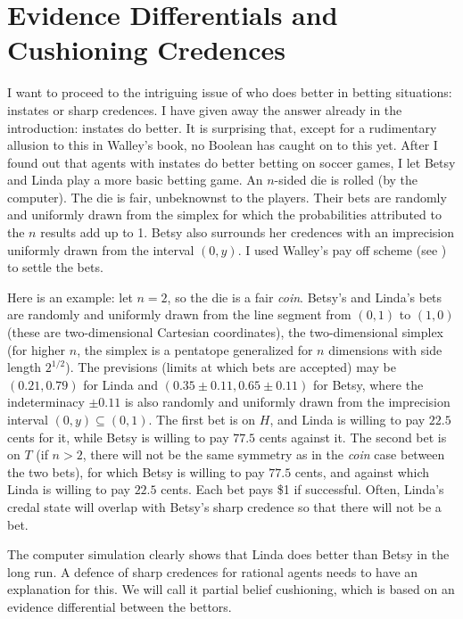 \documentclass[11pt]{article}
\begin{document}
\section{Evidence Differentials and Cushioning Credences}
\label{WalleysWorldCupWoes}

I want to proceed to the intriguing issue of who does better in
betting situations: instates or sharp credences. I have given away the
answer already in the introduction: instates do better. It is
surprising that, except for a rudimentary allusion to this in Walley's
book, no Boolean has caught on to this yet. After I found out that
agents with instates do better betting on soccer games, I let Betsy
and Linda play a more basic betting game. An $n$-sided die is rolled
(by the computer). The die is fair, unbeknownst to the players. Their
bets are randomly and uniformly drawn from the simplex for which the
probabilities attributed to the $n$ results add up to 1. Betsy also
surrounds her credences with an imprecision uniformly drawn from the
interval $(0,y)$. I used Walley's pay off scheme (see
) to settle the bets.

Here is an example: let $n=2$, so the die is a fair \textit{coin}.
Betsy's and Linda's bets are randomly and uniformly drawn from the
line segment from $(0,1)$ to $(1,0)$ (these are two-dimensional
Cartesian coordinates), the two-dimensional simplex (for higher $n$,
the simplex is a pentatope generalized for $n$ dimensions with side
length $2^{1/2}$). The previsions (limits at which bets are accepted)
may be $(0.21,0.79)$ for Linda and $(0.35\pm{}0.11,0.65\pm{}0.11)$ for
Betsy, where the indeterminacy $\pm{}0.11$ is also randomly and
uniformly drawn from the imprecision interval $(0,y)\subseteq(0,1)$.
The first bet is on $H$, and Linda is willing to pay $22.5$ cents for
it, while Betsy is willing to pay $77.5$ cents against it. The second
bet is on $T$ (if $n>2$, there will not be the same symmetry as in the
\textit{coin} case between the two bets), for which Betsy is willing
to pay $77.5$ cents, and against which Linda is willing to pay $22.5$
cents. Each bet pays \$1 if successful. Often, Linda's credal state
will overlap with Betsy's sharp credence so that there will not be a
bet.

The computer simulation clearly shows that Linda does better than
Betsy in the long run. A defence of sharp credences for rational
agents needs to have an explanation for this. We will call it partial
belief cushioning, which is based on an evidence differential between
the bettors.
\end{document}
